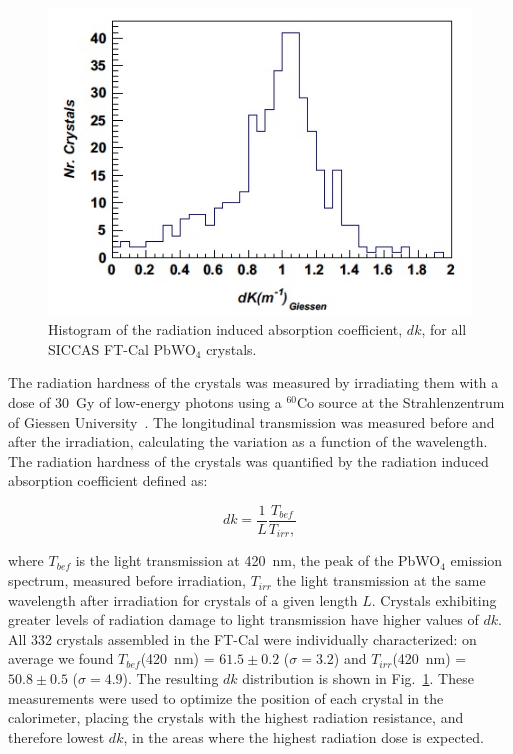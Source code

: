 \begin{figure}[th!]
\centering 
\includegraphics[width=0.85\columnwidth]{./fig/dk.jpeg} 
\caption{Histogram of the radiation induced absorption coefficient, $dk$, for all SICCAS FT-Cal PbWO$_4$ crystals.}
\label{fig:dk} 
\end{figure}

The radiation hardness of the crystals was measured by irradiating them with a dose of 30~Gy of low-energy photons
using a $^{60}$Co source at the Strahlenzentrum of Giessen University~\cite{radhard}. The longitudinal transmission
was measured before and after the irradiation, calculating the variation as a function of the wavelength. The radiation
hardness of the crystals was quantified by the radiation induced absorption coefficient defined as:

\begin{equation}
dk = \frac{1}{L}\frac{T_{bef}}{T_{irr},}
\end{equation}

\noindent
where $T_{bef}$ is the light transmission at 420~nm, the peak of the PbWO$_4$ emission spectrum, measured before
irradiation, $T_{irr}$ the light transmission at the same wavelength after irradiation for crystals of a given length $L$. 
Crystals exhibiting greater levels of radiation damage to light transmission have higher values of $dk$. All 332
crystals assembled in the FT-Cal were individually characterized: on average we found 
$T_{bef}$(420~nm) = $61.5 \pm 0.2$ ($\sigma=3.2$) and $T_{irr}$(420~nm) = $50.8 \pm 0.5$ ($\sigma=4.9$). 
The resulting $dk$ distribution is shown in Fig.~\ref{fig:dk}. These measurements were used to optimize the position
of each crystal in the calorimeter, placing the crystals with the highest radiation resistance, and therefore lowest
$dk$, in the areas where the highest radiation dose is expected.

